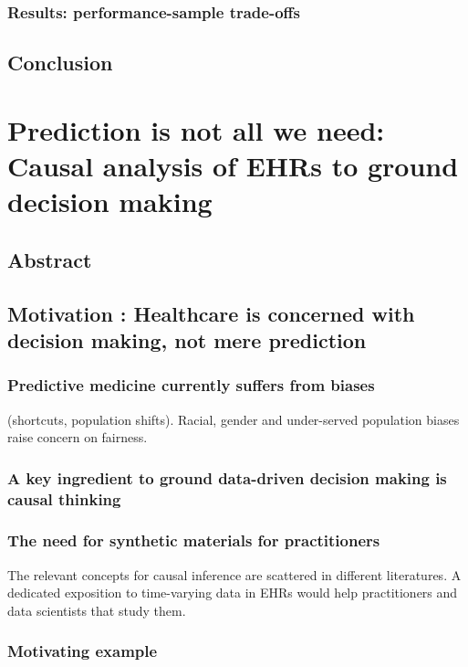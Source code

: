 \documentclass{report}
\begin{document}
\subsection{Results: performance-sample trade-offs}

\section{Conclusion}\label{sec:predictive_models:conclusion}

\chapter{Prediction is not all we need: Causal analysis of EHRs to ground decision making}\label{chapter:causal_tuto}
\section{Abstract}\label{sec:causal_tuto:abstract}

\section{Motivation : Healthcare is concerned with decision making, not mere prediction}\label{sec:causal_tuto:motivation}

\subsection{Predictive medicine currently suffers from biases}\label{subsec:causal_tuto:predictive_medicine_biases}
(shortcuts, population shifts). Racial, gender and under-served population biases raise concern on fairness.
\subsection{A key ingredient to ground data-driven decision making is causal thinking}

\subsection{The need for synthetic materials for practitioners}\label{subsec:causal_tuto:synthetic_materials}

The relevant concepts for causal inference are scattered in different literatures. A dedicated exposition to time-varying data in EHRs would help practitioners and data scientists that study them.
\subsection{Motivating example}\label{subsec:causal_tuto:motivating_example}
\end{document}
